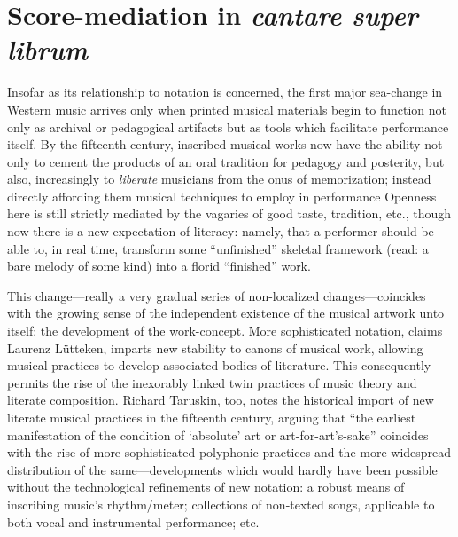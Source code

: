 

        
        
\section{Score-mediation in \textit{cantare super librum}}


    Insofar as its relationship to notation is concerned, the first major sea-change in Western music arrives only when printed musical materials begin to function not only as archival or pedagogical artifacts but as tools which facilitate performance itself. By the fifteenth century, inscribed musical works now have the ability not only to cement the products of an oral tradition for pedagogy and posterity, but also, increasingly to \textit{liberate} musicians from the onus of memorization; instead directly affording them musical techniques to employ in performance Openness here is still strictly mediated by the vagaries of good taste, tradition, etc., though now there is a new expectation of literacy: namely, that a performer should be able to, in real time, transform some ``unfinished'' skeletal framework (read: a bare melody of some kind) into a florid ``finished'' work.

    This change---really a very gradual series of non-localized changes---coincides with the growing sense of the independent existence of the musical artwork unto itself: the development of the work-concept. More sophisticated notation, claims Laurenz Lütteken, imparts new stability to canons of musical work, allowing musical practices to develop associated bodies of literature. This consequently permits the rise of the inexorably linked twin practices of music theory and literate composition.\autocite[57]{Lutteken_2020} Richard Taruskin, too, notes the historical import of new literate musical practices in the fifteenth century, arguing that ``the earliest manifestation of the condition of `absolute' art or art-for-art's-sake'' coincides with the rise of more sophisticated polyphonic practices and the more widespread distribution of the same---developments which would hardly have been possible without the technological refinements of new notation: a robust means of inscribing music's rhythm/meter; collections of non-texted songs, applicable to both vocal and instrumental performance; etc.\autocite[541]{Taruskin_2009}

